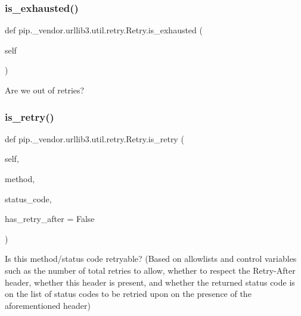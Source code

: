 \subsubsection{\texorpdfstring{is\+\_\+exhausted()}{is\_exhausted()}}
{\footnotesize\ttfamily def pip.\+\_\+vendor.\+urllib3.\+util.\+retry.\+Retry.\+is\+\_\+exhausted (\begin{DoxyParamCaption}\item[{}]{self }\end{DoxyParamCaption})}

\begin{DoxyVerb}Are we out of retries?\end{DoxyVerb}
 \mbox{\label{classpip_1_1__vendor_1_1urllib3_1_1util_1_1retry_1_1Retry_adcf6a54946ef419bffbcd68356b5093a}} 
\subsubsection{\texorpdfstring{is\+\_\+retry()}{is\_retry()}}
{\footnotesize\ttfamily def pip.\+\_\+vendor.\+urllib3.\+util.\+retry.\+Retry.\+is\+\_\+retry (\begin{DoxyParamCaption}\item[{}]{self,  }\item[{}]{method,  }\item[{}]{status\+\_\+code,  }\item[{}]{has\+\_\+retry\+\_\+after = {\ttfamily False} }\end{DoxyParamCaption})}

\begin{DoxyVerb}Is this method/status code retryable? (Based on allowlists and control
variables such as the number of total retries to allow, whether to
respect the Retry-After header, whether this header is present, and
whether the returned status code is on the list of status codes to
be retried upon on the presence of the aforementioned header)
\end{DoxyVerb}
 \mbox{\label{classpip_1_1__vendor_1_1urllib3_1_1util_1_1retry_1_1Retry_a435586bb930881b6d9d802c9aed51c9c}} 
